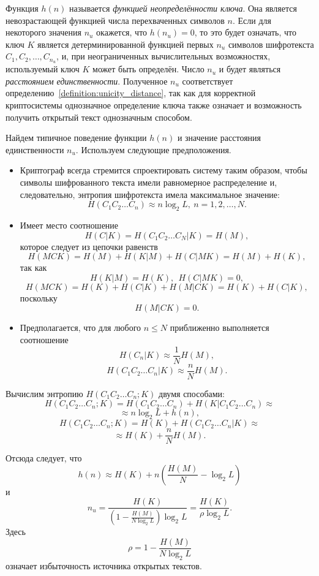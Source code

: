 Функция $h(n)$ называется \emph{функцией неопределённости ключа}. Она является невозрастающей функцией числа перехваченных символов $n$. Если для некоторого значения $n_u$ окажется, что $h ( n_u ) = 0$, то это будет означать, что ключ $K$ является детерминированной функцией первых $n_u$ символов шифротекста $C_1, C_2, \dots, C_{n_u}$, и, при неограниченных вычислительных возможностях, используемый ключ $K$ может быть определён. Число $n_u$ и будет являться \emph{расстоянием единственности}. Полученное $n_u$ соответствует определению~\ref{definition:unicity_distance}, так как для корректной криптосистемы однозначное определение ключа также означает и возможность получить открытый текст однозначным способом.

Найдем типичное поведение функции $h(n)$ и значение расстояния единственности $n_u$. Используем следующие предположения.
\begin{itemize}
    \item Криптограф всегда стремится спроектировать систему таким образом, чтобы символы шифрованного текста имели равномерное распределение и, следовательно, энтропия шифротекста имела максимальное значение:
            \[ H(C_1 C_2 \dots C_n) \approx n \log_2 L, ~ n = 1, 2, \dots, N. \]
    \item Имеет место соотношение
            \[ H(C | K) = H(C_1 C_2 \dots C_N | K)  =  H(M), \]
        которое следует из цепочки равенств
            \[ H(MCK) = H(M) + H(K | M) + H(C | MK) = H(M) + H(K), \]
        так как
            \[ H(K | M) = H(K), ~~ H(C | MK) = 0, \]
            \[H(MCK) = H(K) + H(C | K) + H(M | CK) = H(K) + H(C | K), \]
        поскольку
            \[ H(M | CK) = 0. \]
    \item Предполагается, что для любого $n \le N$ приближенно выполняется соотношение
        \[ H(C_n | K) \approx \frac{1}{N} H(M), \]
        \[ H(C_1 C_2\dots C_n | K) \approx \frac{n}{N} H(M). \]
\end{itemize}

Вычислим энтропию $H(C_1 C_2 \dots C_n ; K)$ двумя способами:
    \[ H( C_1 C_2 \dots C_n ; K ) = H(C_1 C_2 \dots C_n) + H(K | C_1 C_2 \dots C_n) \approx \]
        \[ \approx n \log_2 L + h(n), \]
    \[ H( C_1 C_2 \dots C_n ; K ) = H(K) + H(C_1 C_2 \dots C_n | K) \approx \]
        \[ \approx H(K) + \frac{n}{N} H(M). \]

Отсюда следует, что
    \[ h(n) \approx H(K) + n \left( \frac{H(M)}{N} - \log_2 L \right) \]
и
    \[ n_u = \frac{H(K)}{ \left( 1 - \frac{H(M)}{N \log_2 L} \right) \log_2 L} = \frac{H(K)}{\rho \log_2 L}. \]
Здесь
    \[ \rho = 1 - \frac{H(M)}{N \log_2 L} \]
означает избыточность источника открытых текстов.

